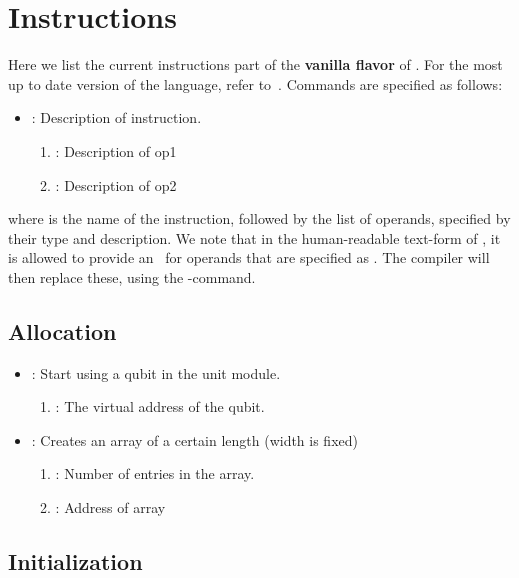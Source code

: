 \section{Instructions}\label{app:instructions}
Here we list the current instructions part of the \textbf{vanilla flavor} of \netqasm.
For the most up to date version of the language, refer to~\cite{git_netqasm}.
Commands are specified as follows:
\begin{itemize}
  \item {}: Description of instruction.
        \begin{enumerate}
          \item \IMMEDIATE : Description of op1
          \item \REGISTER : Description of op2
        \end{enumerate}
\end{itemize}

where  is the name of the instruction, followed by the list of operands, specified by their type and description.
We note that in the human-readable text-form of \netqasm, it is allowed to provide an \IMMEDIATE\ for operands that are specified as \REGISTER.
The compiler will then replace these, using the -command.

\subsection{Allocation}

\begin{itemize}
  \item {}: Start using a qubit in the unit module.
        \begin{enumerate}
          \item \REGISTER: The virtual address of the qubit.
        \end{enumerate}
  \item {}: Creates an array of a certain length (width is fixed)
        \begin{enumerate}
          \item \IMMEDIATE: Number of entries in the array.
          \item \ADDRESS: Address of array
        \end{enumerate}
\end{itemize}


\subsection{Initialization}

